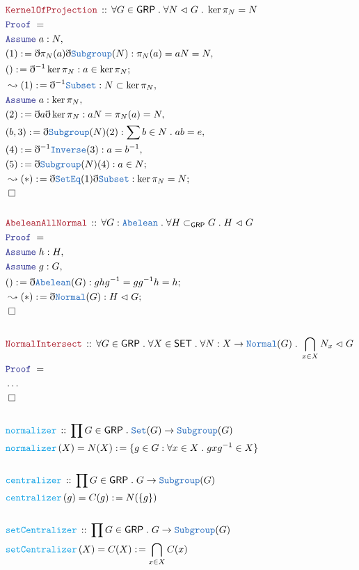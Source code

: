 \documentclass[12pt]{scrartcl}
\newcommand{\TYPE}[1]{\textcolor{NavyBlue}{\mathtt{#1}}}
\newcommand{\FUNC}[1]{\textcolor{Cerulean}{\mathtt{#1}}}
\newcommand{\LOGIC}[1]{\textcolor{Blue}{\mathtt{#1}}}
\newcommand{\THM}[1]{\textcolor{Maroon}{\mathtt{#1}}}
\renewcommand{\.}{\; . \;}
\newcommand{\de}{: \kern 0.1pc =}
\newcommand{\Act}[1]{\left( #1 \right)}
\newcommand{\Theorem}[2]{& \THM{#1} \, :: \, #2 \\ & \Proof = \\ }
\newcommand{\DeclareFunc}[2]{& \FUNC{#1} \, :: \, #2 \\}
\newcommand{\DefineNamedFunc}[4]{&  \FUNC{#1}\Act{#2} = #3 \de #4 \\}
\newcommand{\Page}[1]{ \begin{align*} #1 \end{align*}   }
\newcommand{ \bd }{ \ByDef }
\newcommand{\NoProof}{ & \ldots \\ \EndProof}
\newcommand{\Set}{\TYPE{Set}}
\newcommand{\Say}[3]{& #1 \de #2 : #3, \\}
\newcommand{\Conclude}[3]{& #1 \de #2 : #3; \\}
\newcommand{\Derive}[3]{& \leadsto #1 \de #2 : #3, \\}
\newcommand{\DeriveConclude}[3]{& \leadsto #1 \de #2 : #3 ; \\}
\newcommand{\Assume}[2]{& \LOGIC{Assume} \; #1 : #2, \\}
\newcommand{\QED}{\; \square}
\newcommand{\EndProof}{& \QED \\}
\newcommand{\ByDef}{\eth}
\newcommand{\Proof}{\LOGIC{Proof} \; }
\newcommand{\SET}{\mathsf{SET}}
\newcommand{\Abel}{\TYPE{Abelean}}
\newcommand{\Sgrp}{\subset_{\mathsf{GRP}}}
\newcommand{\Nrml}{\vartriangleleft}
\newcommand{\GRP}{\mathsf{GRP}}
\begin{document}
\Page{
	\Theorem{KernelOfProjection}{\forall G \in \GRP \. \forall N \Nrml G \. \ker \pi_N = N}
	\Assume{a}{N}
	\Say{(1)}{ \bd \pi_N(a) \bd \TYPE{Subgroup}(N) }{ \pi_N (a) = aN = N}
	\Conclude{()}{\bd^{-1} \ker \pi_N}{ a \in \ker \pi_N}
	\Derive{(1)}{\bd^{-1} \TYPE{Subset}}{N \subset \ker \pi_N}
	\Assume{a}{\ker \pi_N}
	\Say{(2)}{\bd a \bd \ker \pi_N}{ aN = \pi_N(a) = N}
	\Say{(b,3)}{\bd \TYPE{Subgroup}(N)(2) }{ \sum b \in N \. ab = e }
	\Say{(4)}{\bd^{-1} \TYPE{Inverse}(3)}{a = b^{-1}}
	\Conclude{(5)}{\bd \TYPE{Subgroup}(N)(4)}{a \in N}
	\DeriveConclude{(*)}{\bd \TYPE{SetEq}(1)\bd \TYPE{Subset}}{\ker \pi_N = N}
	\EndProof
	\\
	\Theorem{AbeleanAllNormal}{\forall G : \Abel \. \forall H \Sgrp G \. H \Nrml G}
	\Assume{h}{H}
	\Assume{g}{G}
	\Conclude{()}{\bd \TYPE{Abelean}(G)}{ghg^{-1}= gg^{-1}h = h}
	\DeriveConclude{(*)}{\bd \TYPE{Normal}(G)}{H \Nrml G}
	\EndProof
	\\
	\Theorem{NormalIntersect}{\forall G \in \GRP \. \forall X \in \SET \. \forall N : X \to \TYPE{Normal}(G) \.  
		\bigcap_{x \in X} N_x \Nrml G
	}
	\NoProof
	\\
	\DeclareFunc{normalizer}{\prod G \in \GRP \.  \Set(G) \to \TYPE{Subgroup}(G)}
	\DefineNamedFunc{normalizer}{X}{N(X)}{\{ g \in G : \forall x \in X \. gxg^{-1} \in X\}}
	\\
	\DeclareFunc{centralizer}{\prod G \in \GRP \. G \to \TYPE{Subgroup}(G)  }
	\DefineNamedFunc{centralizer}{g}{C(g)}{N(\{g\})}
	\\
	\DeclareFunc{setCentralizer}{\prod G \in \GRP \. G \to \TYPE{Subgroup}(G)}
	\DefineNamedFunc{setCentralizer}{X}{C(X)}{\bigcap_{x \in X} C(x)}
}
\end{document}
